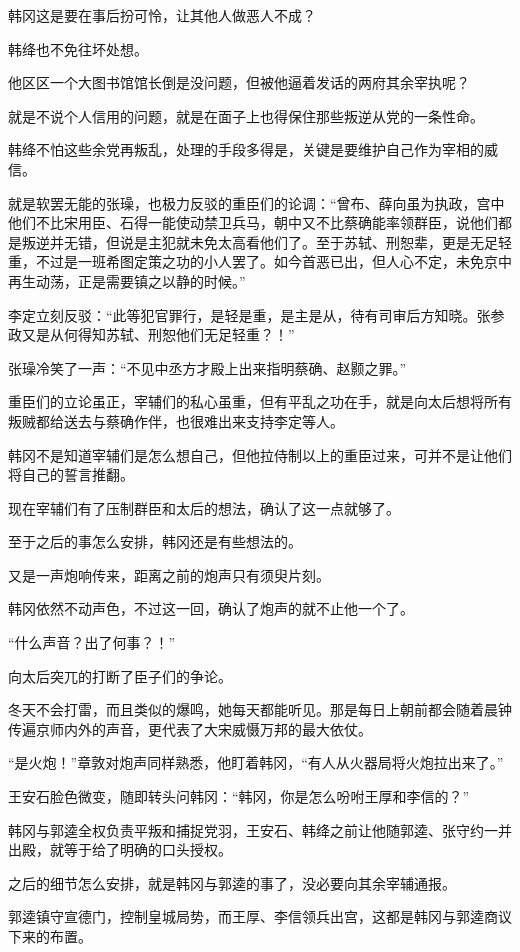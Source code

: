 韩冈这是要在事后扮可怜，让其他人做恶人不成？

韩绛也不免往坏处想。

他区区一个大图书馆馆长倒是没问题，但被他逼着发话的两府其余宰执呢？

就是不说个人信用的问题，就是在面子上也得保住那些叛逆从党的一条性命。

韩绛不怕这些余党再叛乱，处理的手段多得是，关键是要维护自己作为宰相的威信。

就是软罢无能的张璪，也极力反驳的重臣们的论调：“曾布、薛向虽为执政，宫中他们不比宋用臣、石得一能使动禁卫兵马，朝中又不比蔡确能率领群臣，说他们都是叛逆并无错，但说是主犯就未免太高看他们了。至于苏轼、刑恕辈，更是无足轻重，不过是一班希图定策之功的小人罢了。如今首恶已出，但人心不定，未免京中再生动荡，正是需要镇之以静的时候。”

李定立刻反驳：“此等犯官罪行，是轻是重，是主是从，待有司审后方知晓。张参政又是从何得知苏轼、刑恕他们无足轻重？！”

张璪冷笑了一声：“不见中丞方才殿上出来指明蔡确、赵颢之罪。”

重臣们的立论虽正，宰辅们的私心虽重，但有平乱之功在手，就是向太后想将所有叛贼都给送去与蔡确作伴，也很难出来支持李定等人。

韩冈不是知道宰辅们是怎么想自己，但他拉侍制以上的重臣过来，可并不是让他们将自己的誓言推翻。

现在宰辅们有了压制群臣和太后的想法，确认了这一点就够了。

至于之后的事怎么安排，韩冈还是有些想法的。

又是一声炮响传来，距离之前的炮声只有须臾片刻。

韩冈依然不动声色，不过这一回，确认了炮声的就不止他一个了。

“什么声音？出了何事？！”

向太后突兀的打断了臣子们的争论。

冬天不会打雷，而且类似的爆鸣，她每天都能听见。那是每日上朝前都会随着晨钟传遍京师内外的声音，更代表了大宋威慑万邦的最大依仗。

“是火炮！”章敦对炮声同样熟悉，他盯着韩冈，“有人从火器局将火炮拉出来了。”

王安石脸色微变，随即转头问韩冈：“韩冈，你是怎么吩咐王厚和李信的？”

韩冈与郭逵全权负责平叛和捕捉党羽，王安石、韩绛之前让他随郭逵、张守约一并出殿，就等于给了明确的口头授权。

之后的细节怎么安排，就是韩冈与郭逵的事了，没必要向其余宰辅通报。

郭逵镇守宣德门，控制皇城局势，而王厚、李信领兵出宫，这都是韩冈与郭逵商议下来的布置。

